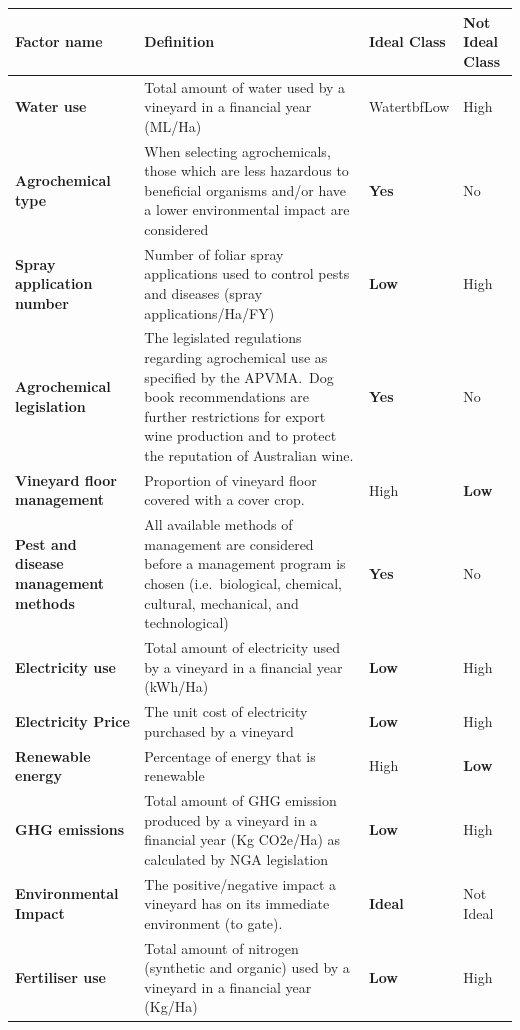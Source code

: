 \documentclass[10pt,letterpaper]{article}
\begin{document}
\begin{table}[h]
    \begin{tabular}{@{}llll@{}}
    \toprule
    \textbf{Factor name} & Definition & \textbf{Ideal Class} & Not Ideal Class \\ \midrule
    \textbf{Water use} & Total amount of water used by a vineyard in a financial year (ML/Ha) &Watertbf{Low} & High \\
    \textbf{Agrochemical type} & When selecting agrochemicals, those which are less hazardous to beneficial organisms and/or have a lower environmental impact are considered & \textbf{Yes} & No \\
    \textbf{Spray application number} & Number of foliar spray applications used to control pests and diseases (spray applications/Ha/FY) & \textbf{Low} & High \\
    \textbf{Agrochemical legislation} & The legislated regulations regarding agrochemical use as specified by the APVMA.~Dog book recommendations are further restrictions for export wine production and to protect the reputation of Australian wine. & \textbf{Yes} & No \\
    \textbf{Vineyard floor management} & Proportion of vineyard floor covered with a cover crop. & High & \textbf{Low} \\
    \textbf{Pest and disease management methods} & All available methods of management are considered before a management program is chosen (i.e.~biological, chemical, cultural, mechanical, and technological) & \textbf{Yes} & No \\
    \textbf{Electricity use} & Total amount of electricity used by a vineyard in a financial year (kWh/Ha) & \textbf{Low} & High \\
    \textbf{Electricity Price} & The unit cost of electricity purchased by a vineyard & \textbf{Low} & High \\
    \textbf{Renewable energy} & Percentage of energy that is renewable & High & \textbf{Low} \\
    \textbf{GHG emissions} & Total amount of GHG emission produced by a vineyard in a financial year (Kg CO2e/Ha) as calculated  by NGA legislation & \textbf{Low} & High \\
    \textbf{Environmental Impact} & The positive/negative impact a vineyard has on its immediate environment (to gate). & \textbf{Ideal} & Not Ideal \\
    \textbf{Fertiliser use} & Total amount of nitrogen (synthetic and organic) used by a vineyard in a financial year (Kg/Ha) & \textbf{Low} & High \\

\end{tabular}
\end{table}
\end{document}

